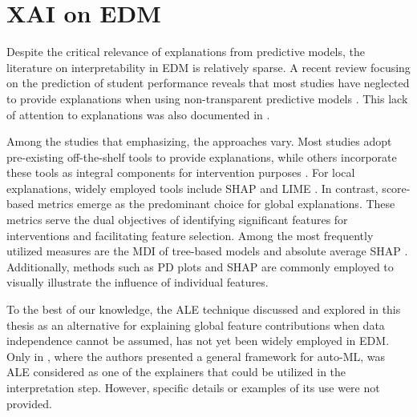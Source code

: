 \section{XAI on EDM}

Despite the critical relevance of explanations from predictive models, the literature on interpretability in \gls{EDM} is relatively sparse. A recent review focusing on the prediction of student performance reveals that most studies have neglected to provide explanations when using non-transparent predictive models \cite{Chitti2020NeedPrediction}. This lack of attention to explanations was also documented in \cite{Livieris2023AnMining}. 

Among the studies that emphasizing, the approaches vary. Most studies adopt pre-existing off-the-shelf tools to provide explanations, while others incorporate these tools as integral components for intervention purposes \cite{Mu2020TowardsStudents, Afzaal2021ExplainableSelf-Regulation}. For local explanations, widely employed tools include \gls{SHAP} \cite{Livieris2023AnMining, Chiu2020GenderHypothesis, Doewes2020StructuralScoring, Oliveira2023TowardsEnglish} and LIME \cite{Livieris2023AnMining, Matetic2019MiningNetworks, Zabriskie2019UsingOutcomes, Hasib2022APerformance, Chen2022Week-WiseIntelligence}. In contrast, score-based metrics emerge as the predominant choice for global explanations. These metrics serve the dual objectives of identifying significant features for interventions and facilitating feature selection. Among the most frequently utilized measures are the \gls{MDI} of tree-based models \cite{Cortez2008UsingPerformance, AshrafATechniques, Zhao2020PredictingData} and absolute average \gls{SHAP} \cite{Hoq2023AnalysisCourse, Rohani2023EarlyMOOC}. Additionally, methods such as \gls{PD} plots \cite{Hong2022RandomSchool, Masci2018StudentApproach} and \gls{SHAP} \cite{Chiu2020GenderHypothesis, Hoq2023AnalysisCourse} are commonly employed to visually illustrate the influence of individual features.

To the best of our knowledge, the \gls{ALE} technique discussed and explored in this thesis as an alternative for explaining global feature contributions when data independence cannot be assumed, has not yet been widely employed in \gls{EDM}. Only in \cite{NovilloRangone2022AutomationLearning}, where the authors presented a general framework for auto-ML, was ALE considered as one of the explainers that could be utilized in the interpretation step. However, specific details or examples of its use were not provided.

